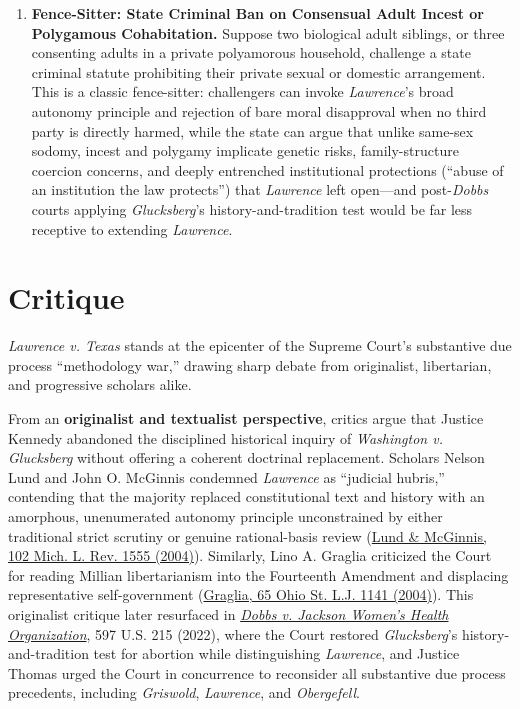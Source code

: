 \documentclass[12pt]{article}
\begin{document}
\begin{enumerate}
\item \textbf{Fence-Sitter: State Criminal Ban on Consensual Adult Incest or Polygamous Cohabitation.} Suppose two biological adult siblings, or three consenting adults in a private polyamorous household, challenge a state criminal statute prohibiting their private sexual or domestic arrangement. This is a classic fence-sitter: challengers can invoke \textit{Lawrence}'s broad autonomy principle and rejection of bare moral disapproval when no third party is directly harmed, while the state can argue that unlike same-sex sodomy, incest and polygamy implicate genetic risks, family-structure coercion concerns, and deeply entrenched institutional protections (``abuse of an institution the law protects'') that \textit{Lawrence} left open---and post-\textit{Dobbs} courts applying \textit{Glucksberg}'s history-and-tradition test would be far less receptive to extending \textit{Lawrence}.
\end{enumerate}

\section{Critique}
\textit{Lawrence v. Texas} stands at the epicenter of the Supreme Court's substantive due process ``methodology war,'' drawing sharp debate from originalist, libertarian, and progressive scholars alike.

From an \textbf{originalist and textualist perspective}, critics argue that Justice Kennedy abandoned the disciplined historical inquiry of \textit{Washington v. Glucksberg} without offering a coherent doctrinal replacement. Scholars Nelson Lund and John O. McGinnis condemned \textit{Lawrence} as ``judicial hubris,'' contending that the majority replaced constitutional text and history with an amorphous, unenumerated autonomy principle unconstrained by either traditional strict scrutiny or genuine rational-basis review (\href{https://repository.law.umich.edu/cgi/viewcontent.cgi?article=1719&context=mlr}{Lund \& McGinnis, 102 Mich. L. Rev. 1555 (2004)}). Similarly, Lino A. Graglia criticized the Court for reading Millian libertarianism into the Fourteenth Amendment and displacing representative self-government (\href{https://kb.osu.edu/bitstreams/f95c9b0e-cc7a-5c92-b702-7bf6e345f0a9/download}{Graglia, 65 Ohio St. L.J. 1141 (2004)}). This originalist critique later resurfaced in \href{https://supreme.justia.com/cases/federal/us/597/19-1392/}{\textit{Dobbs v. Jackson Women's Health Organization}}, 597 U.S. 215 (2022), where the Court restored \textit{Glucksberg}'s history-and-tradition test for abortion while distinguishing \textit{Lawrence}, and Justice Thomas urged the Court in concurrence to reconsider all substantive due process precedents, including \textit{Griswold}, \textit{Lawrence}, and \textit{Obergefell}.
\end{document}
